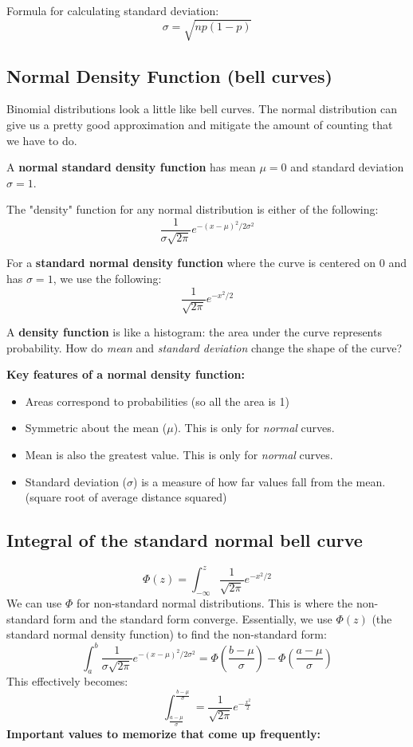 \documentclass[titlepage, 12pt, leqno]{article}
\begin{document}
\begin{note}
    Formula for calculating standard deviation:
    \[
        \sigma = \sqrt{np(1-p)}
    \]
\end{note}

\subsection{Normal Density Function (bell curves)}
Binomial distributions look a little like bell curves. The normal distribution can give us a pretty good approximation and mitigate the amount of counting that we have to do.
 \begin{definition}
     A \textbf{normal standard density function} has mean $\mu = 0$ and standard deviation $\sigma = 1$.
 \end{definition}
 

The "density" function for any normal distribution is either of the following:
\[
    \frac{1}{\sigma\sqrt{2\pi}}e^{-(x-\mu)^2/2\sigma^2}
\]

For a \textbf{standard normal density function} where the curve is centered on 0 and has $\sigma = 1$, we use the following:
\[
    \boxed{\frac{1}{\sqrt{2\pi}}e^{-x^2/2}}
\]

\begin{note}
A \textbf{density function} is like a histogram: the area under the curve represents probability. How do \textit{mean} and \textit{standard deviation} change the shape of the curve?
\end{note}

\textbf{Key features of a normal density function:} 
\begin{itemize}
    \item Areas correspond to probabilities (so all the area is 1)
    \item Symmetric about the mean ($\mu$). This is only for \textit{normal} curves.
    \item Mean is also the greatest value. This is only for \textit{normal} curves.
    \item Standard deviation ($\sigma$) is a measure of how far values fall from the mean. (square root of average distance squared)
\end{itemize}

\subsection{Integral of the standard normal bell curve}
\[
    \Phi(z) = \int_{-\infty}^{z} \frac{1}{\sqrt{2\pi}}e^{-x^2/2}
\]
We can use $\Phi$ for non-standard normal distributions. This is where the non-standard form and the standard form converge. Essentially, we use $\Phi(z)$ (the standard normal density function) to find the non-standard form:
\[
    \int_{a}^{b} \frac{1}{\sigma\sqrt{2\pi}}e^{-(x-\mu)^2/2\sigma^2} = \Phi \left(\frac{b - \mu}{\sigma}\right) - \Phi \left(\frac{a-\mu}{\sigma}\right)
\]
This effectively becomes:
\[
    \int_{\frac{a-\mu}{\sigma} }^{\frac{b-\mu}{\sigma}} = \frac{1}{\sqrt{2\pi}}e^{-\frac{x^2}{2}} 
\]
\textbf{Important values to memorize that come up frequently:} 
\end{document}

